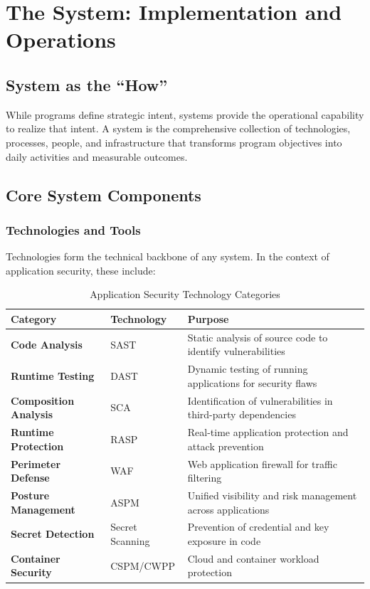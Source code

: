 \documentclass[11pt,letterpaper]{article}
\begin{document}
\section{The System: Implementation and Operations}

\subsection{System as the ``How''}

While programs define strategic intent, systems provide the operational capability to realize that intent. A system is the comprehensive collection of technologies, processes, people, and infrastructure that transforms program objectives into daily activities and measurable outcomes.

\subsection{Core System Components}

\subsubsection{Technologies and Tools}

Technologies form the technical backbone of any system. In the context of application security, these include:

\begin{table}[H]
\centering
\renewcommand{\arraystretch}{1.3}
\begin{tabularx}{\textwidth}{>{\bfseries}l l >{\raggedright\arraybackslash}X}
\toprule
\textbf{Category} & \textbf{Technology} & \textbf{Purpose} \\
\midrule
Code Analysis & SAST & Static analysis of source code to identify vulnerabilities \\
Runtime Testing & DAST & Dynamic testing of running applications for security flaws \\
Composition Analysis & SCA & Identification of vulnerabilities in third-party dependencies \\
Runtime Protection & RASP & Real-time application protection and attack prevention \\
Perimeter Defense & WAF & Web application firewall for traffic filtering \\
Posture Management & ASPM & Unified visibility and risk management across applications \\
Secret Detection & Secret Scanning & Prevention of credential and key exposure in code \\
Container Security & CSPM/CWPP & Cloud and container workload protection \\
\bottomrule
\end{tabularx}
\caption{Application Security Technology Categories}
\label{tab:security-technologies}
\end{table}
\end{document}
